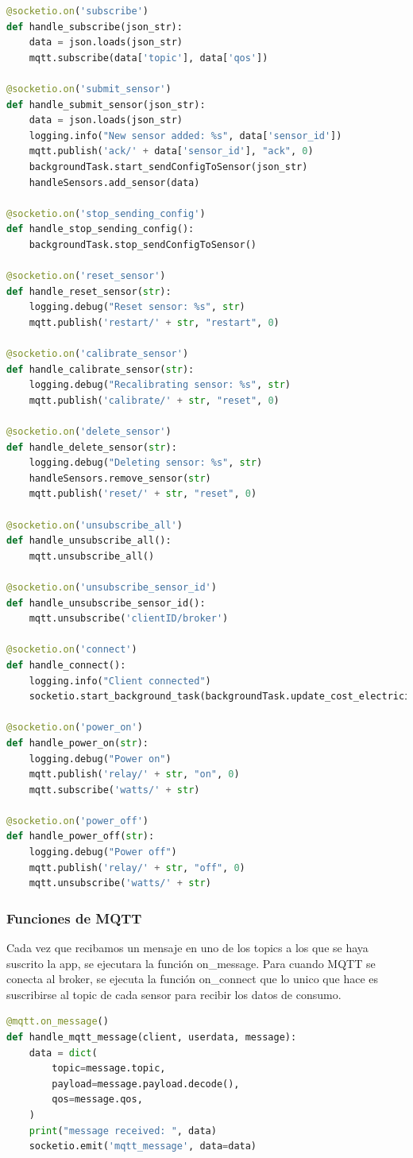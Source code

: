 \begin{titlepage}
\begin{lstlisting}[language=python]
@socketio.on('subscribe')
def handle_subscribe(json_str):
	data = json.loads(json_str)
	mqtt.subscribe(data['topic'], data['qos'])

@socketio.on('submit_sensor')
def handle_submit_sensor(json_str):
	data = json.loads(json_str)
	logging.info("New sensor added: %s", data['sensor_id'])
	mqtt.publish('ack/' + data['sensor_id'], "ack", 0)
	backgroundTask.start_sendConfigToSensor(json_str)
	handleSensors.add_sensor(data)

@socketio.on('stop_sending_config')
def handle_stop_sending_config():
	backgroundTask.stop_sendConfigToSensor()

@socketio.on('reset_sensor')
def handle_reset_sensor(str):
	logging.debug("Reset sensor: %s", str)
	mqtt.publish('restart/' + str, "restart", 0)

@socketio.on('calibrate_sensor')
def handle_calibrate_sensor(str):
	logging.debug("Recalibrating sensor: %s", str)
	mqtt.publish('calibrate/' + str, "reset", 0)

@socketio.on('delete_sensor')
def handle_delete_sensor(str):
	logging.debug("Deleting sensor: %s", str)
	handleSensors.remove_sensor(str)
	mqtt.publish('reset/' + str, "reset", 0)

@socketio.on('unsubscribe_all')
def handle_unsubscribe_all():
	mqtt.unsubscribe_all()

@socketio.on('unsubscribe_sensor_id')
def handle_unsubscribe_sensor_id():
	mqtt.unsubscribe('clientID/broker')

@socketio.on('connect')
def handle_connect():
	logging.info("Client connected")
	socketio.start_background_task(backgroundTask.update_cost_electricity)

@socketio.on('power_on')
def handle_power_on(str):
    logging.debug("Power on")
    mqtt.publish('relay/' + str, "on", 0)
    mqtt.subscribe('watts/' + str)

@socketio.on('power_off')
def handle_power_off(str):
    logging.debug("Power off")
    mqtt.publish('relay/' + str, "off", 0)
    mqtt.unsubscribe('watts/' + str)

\end{lstlisting}

\subsubsection{Funciones de MQTT}
Cada vez que recibamos un mensaje en uno de los topics a los que se haya suscrito la app, se ejecutara la función on\_message. Para cuando MQTT se conecta al broker, se ejecuta la función on\_connect que lo unico que hace es suscribirse al topic de cada sensor para recibir los datos de consumo.\\
\begin{lstlisting}[language=python]
@mqtt.on_message()
def handle_mqtt_message(client, userdata, message):
	data = dict(
		topic=message.topic,
		payload=message.payload.decode(),
		qos=message.qos,
	)
	print("message received: ", data)
	socketio.emit('mqtt_message', data=data)


\end{lstlisting}
\end{titlepage}

